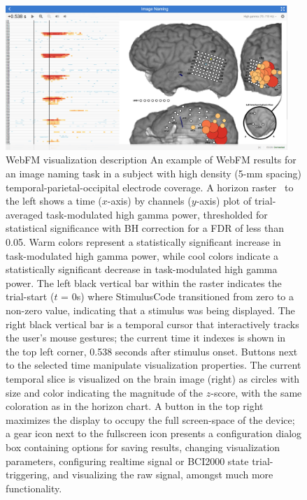 \documentclass[utf8]{frontiersSCNS}
\begin{document}
\begin{figure}[h!]
\begin{center}
\includegraphics[width=0.95\textwidth]{figures/f4_webfm_vis}%
\end{center}
\caption{WebFM visualization description
An example of WebFM results for an image naming task in a subject with high density (5-mm spacing) temporal-parietal-occipital electrode coverage.
A horizon raster~\cite{heer_sizing_2009} to the left shows a time ($x$-axis) by channels ($y$-axis) plot of trial-averaged task-modulated high gamma power, thresholded for statistical significance with BH correction for a FDR of less than 0.05.
Warm colors represent a statistically significant increase in task-modulated high gamma power, while cool colors indicate a statistically significant decrease in task-modulated high gamma power.
The left black vertical bar within the raster indicates the trial-start ($t$ = 0s) where StimulusCode transitioned from zero to a non-zero value, indicating that a stimulus was being displayed.
The right black vertical bar is a temporal cursor that interactively tracks the user's mouse gestures; the current time it indexes is shown in the top left corner, 0.538 seconds after stimulus onset.
Buttons next to the selected time manipulate visualization properties.
The current temporal slice is visualized on the brain image (right) as circles with size and color indicating the magnitude of the $z$-score, with the same coloration as in the horizon chart.
A button in the top right maximizes the display to occupy the full screen-space of the device; a gear icon next to the fullscreen icon presents a configuration dialog box containing options for saving results, changing visualization parameters, configuring realtime signal or BCI2000 state trial-triggering, and visualizing the raw signal, amongst much more functionality. 
}
\end{figure}
\end{document}
